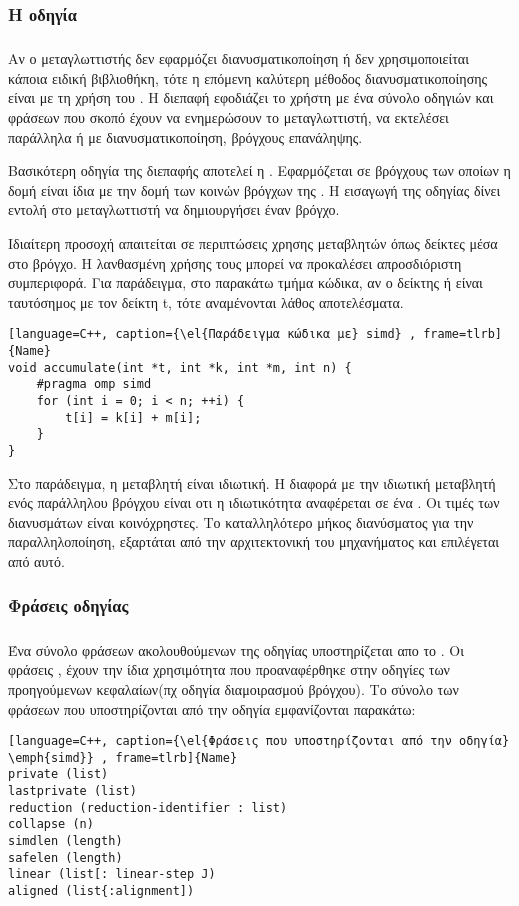 \clearpage
\subsubsection{Η οδηγία \emph{}}
\subparagraph{}
Αν ο μεταγλωττιστής δεν εφαρμόζει διανυσματικοποίηση ή δεν χρησιμοποιείται κάποια ειδική βιβλιοθήκη, τότε η επόμενη καλύτερη μέθοδος διανυσματικοποίησης είναι με τη χρήση του \emph{}. Η διεπαφή εφοδιάζει το χρήστη με ένα σύνολο οδηγιών και φράσεων που σκοπό έχουν να ενημερώσουν το μεταγλωττιστή, να εκτελέσει παράλληλα ή με διανυσματικοποίηση, βρόγχους επανάληψης.

Βασικότερη οδηγία της διεπαφής αποτελεί η \textbf{\emph{}}. Εφαρμόζεται σε βρόγχους των οποίων η δομή είναι ίδια με την δομή των κοινών βρόγχων της \emph{}. Η εισαγωγή της οδηγίας \emph{} δίνει εντολή στο μεταγλωττιστή να δημιουργήσει έναν \emph{} βρόγχο.

Ιδιαίτερη προσοχή απαιτείται σε περιπτώσεις χρησης  μεταβλητών όπως δείκτες μέσα στο βρόγχο. Η λανθασμένη χρήσης τους μπορεί να προκαλέσει απροσδιόριστη συμπεριφορά.
Για παράδειγμα, στο παρακάτω τμήμα κώδικα, αν ο δείκτης \emph{} ή \emph{} είναι ταυτόσημος με τον δείκτη t, τότε αναμένονται λάθος αποτελέσματα.
\ \\

\begin{lstlisting}[language=C++, caption={\el{Παράδειγμα κώδικα με} simd} , frame=tlrb]{Name}
void accumulate(int *t, int *k, int *m, int n) {
	#pragma omp simd
	for (int i = 0; i < n; ++i) {
		t[i] = k[i] + m[i];
	}
}
\end{lstlisting}


Στο παράδειγμα, η μεταβλητή \emph{} είναι ιδιωτική. Η διαφορά με την ιδιωτική μεταβλητή ενός παράλληλου βρόγχου είναι οτι η ιδιωτικότητα αναφέρεται σε ένα \emph{}. Oι τιμές των διανυσμάτων \emph{} είναι κοινόχρηστες. Το καταλληλότερο μήκος διανύσματος για την παραλληλοποίηση, εξαρτάται από την αρχιτεκτονική του μηχανήματος και επιλέγεται από αυτό.
\ \\
\subsubsection{Φράσεις οδηγίας \emph{}}
\subparagraph{}
Ένα σύνολο φράσεων ακολουθούμενων της οδηγίας \emph{} υποστηρίζεται απο το \emph{}. Οι φράσεις \emph{}, έχουν την ίδια χρησιμότητα που προαναφέρθηκε στην οδηγίες των προηγούμενων κεφαλαίων(πχ οδηγία διαμοιρασμού βρόγχου).
Το σύνολο των φράσεων που υποστηρίζονται από την οδηγία εμφανίζονται παρακάτω:
\begin{lstlisting}[language=C++, caption={\el{Φράσεις που υποστηρίζονται από την οδηγία} \emph{simd}} , frame=tlrb]{Name}
private (list)
lastprivate (list)
reduction (reduction-identifier : list)
collapse (n)
simdlen (length)
safelen (length)
linear (list[: linear-step J)
aligned (list{:alignment])
\end{lstlisting}
\clearpage
